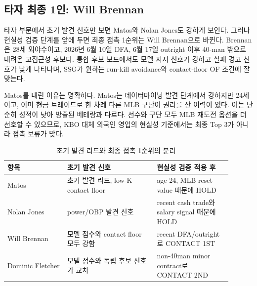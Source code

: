 \documentclass[11pt,a4paper]{article}
\begin{document}
\subsection{타자 최종 1인: Will Brennan}
타자 부문에서 초기 발견 신호만 보면 Matos와 Nolan Jones도 강하게 보인다. 그러나 현실성 검증 단계를 앞에 두면 최종 접촉 1순위는 Will Brennan으로 바뀐다. Brennan은 28세 외야수이고, 2026년 6월 10일 DFA, 6월 17일 outright 이후 40-man 밖으로 내려온 고접근성 후보다. 통합 후보 보드에서도 모델 지지 신호가 강하고 실패 경고 신호가 낮게 나타나며, SSG가 원하는 run-kill avoidance와 contact-floor OF 조건에 잘 맞는다.

Matos를 내린 이유는 명확하다. Matos는 데이터마이닝 발견 단계에서 강하지만 24세이고, 이미 현금 트레이드로 한 차례 다른 MLB 구단이 권리를 산 이력이 있다. 이는 단순히 성적이 낮아 방출된 베테랑과 다르다. 선수와 구단 모두 MLB 재도전 옵션을 더 선호할 수 있으므로, KBO 대체 외국인 영입의 현실성 기준에서는 최종 Top 3가 아니라 접촉 보류가 맞다.

\begin{table}[H]
\centering
\caption{초기 발견 리드와 최종 접촉 1순위의 분리}
\label{tab:matos_market_gate}
\small
\begin{tabularx}{\linewidth}{L{0.24\linewidth}L{0.36\linewidth}L{0.30\linewidth}}
\toprule
항목 & 초기 발견 신호 & 현실성 검증 적용 후 \\
\midrule
Matos & 초기 발견 리드, low-K contact floor & age 24, MLB reset value 때문에 HOLD \\
Nolan Jones & power/OBP 발견 신호 & recent cash trade와 salary signal 때문에 HOLD \\
Will Brennan & 모델 점수와 contact floor 모두 강함 & recent DFA/outright로 CONTACT 1ST \\
Dominic Fletcher & 모델 점수와 독립 후보 신호가 교차 & non-40man minor contract로 CONTACT 2ND \\
\bottomrule
\end{tabularx}
\end{table}
\end{document}
